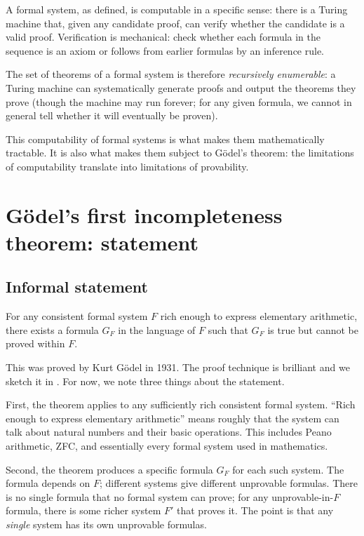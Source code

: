 A formal system, as defined, is computable in a specific sense: there
is a Turing machine that, given any candidate proof, can verify
whether the candidate is a valid proof. Verification is mechanical:
check whether each formula in the sequence is an axiom or follows
from earlier formulas by an inference rule.

The set of theorems of a formal system is therefore
\emph{recursively enumerable}: a Turing machine can systematically
generate proofs and output the theorems they prove (though the
machine may run forever; for any given formula, we cannot in general
tell whether it will eventually be proven).

This computability of formal systems is what makes them
mathematically tractable. It is also what makes them subject to
G\"odel's theorem: the limitations of computability translate into
limitations of provability.

\section{G\"odel's first incompleteness theorem: statement}
\label{sec:godel-statement}

\subsection{Informal statement}

\begin{conceptbox}
\label{conc:godel-1}
For any consistent formal system $F$ rich enough to express
elementary arithmetic, there exists a formula $G_F$ in the language
of $F$ such that $G_F$ is true but cannot be proved within $F$.
\end{conceptbox}

This was proved by Kurt G\"odel in 1931. The proof technique is
brilliant and we sketch it in . For now, we
note three things about the statement.

First, the theorem applies to any sufficiently rich consistent
formal system. ``Rich enough to express elementary arithmetic''
means roughly that the system can talk about natural numbers and
their basic operations. This includes Peano arithmetic, ZFC, and
essentially every formal system used in mathematics.

Second, the theorem produces a specific formula $G_F$ for each such
system. The formula depends on $F$; different systems give
different unprovable formulas. There is no single formula that no
formal system can prove; for any unprovable-in-$F$ formula, there is
some richer system $F'$ that proves it. The point is that any
\emph{single} system has its own unprovable formulas.

